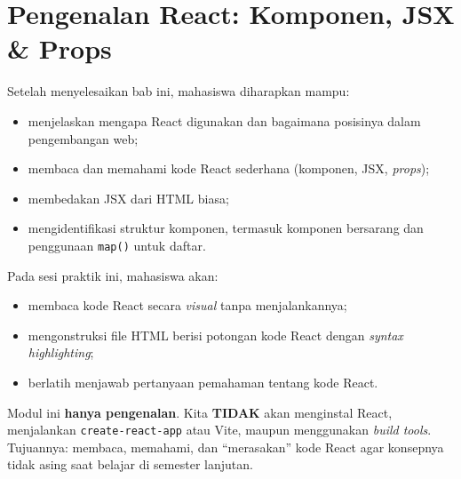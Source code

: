 
\chapter{Pengenalan React: Komponen, JSX \& Props}
\label{chap:mjs-13}

\begin{capaian}
Setelah menyelesaikan bab ini, mahasiswa diharapkan mampu:
\begin{itemize}
  \item menjelaskan mengapa React digunakan dan bagaimana posisinya dalam pengembangan web;
  \item membaca dan memahami kode React sederhana (komponen, JSX, \emph{props});
  \item membedakan JSX dari HTML biasa;
  \item mengidentifikasi struktur komponen, termasuk komponen bersarang dan penggunaan \texttt{map()} untuk daftar.
\end{itemize}
\end{capaian}

\begin{tujuanpraktik}
Pada sesi praktik ini, mahasiswa akan:
\begin{itemize}
  \item membaca kode React secara \emph{visual} tanpa menjalankannya;
  \item mengonstruksi file HTML berisi potongan kode React dengan \emph{syntax highlighting};
  \item berlatih menjawab pertanyaan pemahaman tentang kode React.
\end{itemize}
\end{tujuanpraktik}

\begin{catatan}
Modul ini \textbf{hanya pengenalan}. Kita \textbf{TIDAK} akan menginstal React, menjalankan \texttt{create-react-app} atau Vite, maupun menggunakan \emph{build tools}. Tujuannya: membaca, memahami, dan ``merasakan'' kode React agar konsepnya tidak asing saat belajar di semester lanjutan.
\end{catatan}

